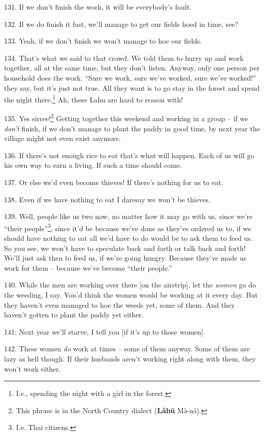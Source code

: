 131. If we don't finish the work, it will be everybody's fault.

132. If we do finish it fast, we'll manage to get our fields hoed in time, see?

133. Yeah, if we don't finish we won't manage to hoe our fields.

134. That's what we said to that crowd. We told them to hurry up and work together,
all at the same time, but they don't listen. Anyway, only one person per household
does the work. ``Sure we work, sure we've worked, sure we've worked!''
they say, but it's just not true. All they want is to go stay in the forest and
spend the night there.\footnote{I.e., spending the night with a girl in the forest.} Ah, these Lahu are hard to reason with!

135. Yes sirree!\footnote{This phrase is in the North Country dialect (\textbf{Lâhū} Mə́-nə́).} Getting together this weekend and working in a group -- if
we\textit{ don't} finish, if we don't manage to plant the paddy in good time, by
next year the village might not even exist anymore.

136. If there's not enough rice to eat that's what will happen. Each of us will
go his own way to earn a living. If such a time should come.

137. Or else we'd even become thieves! If there's nothing for us to eat.

138. Even if we have nothing to eat I daresay we won't be thieves.

139. Well, people like us two now, no matter how it may go with us, since we're
``their people''\footnote{I.e. Thai citizens.}, since it'd be because we've done as they've ordered us to,
if we should have nothing to eat all we'd have to do would be to ask them to feed
us. So you see, we won't have to speculate back and forth or talk back and forth!
We'll just ask then to feed us, if we're going hungry. Because they've made us
work for them -- because we've become ``their people.''

140. While the men are working over there [on the airstrip], let the \textit{women
}go do the weeding, I say. You'd think the women would be working at it every day.
But they haven't even managed to hoe the weeds yet, some of them. And they haven't
gotten to plant the paddy yet either.

 141: Next year we'll starve, I tell you [if it's up
to those women].


142. These women \textit{do} work at times -- some of them anyway. Some of them
are lazy as hell though. If their husbands aren't working right along with them,
they won't work either.

